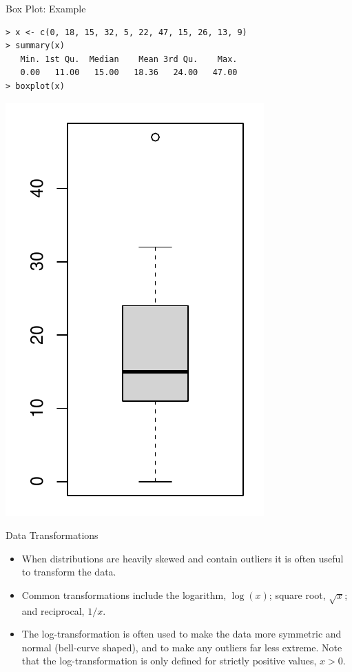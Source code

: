 \documentclass{beamer}
\begin{document}
\begin{frame}[fragile]{Box Plot: Example}
\small
\begin{verbatim}
> x <- c(0, 18, 15, 32, 5, 22, 47, 15, 26, 13, 9)
> summary(x)
   Min. 1st Qu.  Median    Mean 3rd Qu.    Max. 
   0.00   11.00   15.00   18.36   24.00   47.00 
> boxplot(x)
\end{verbatim}
\normalsize
\includegraphics[scale=0.4]{boxplot1.pdf}
\end{frame}

\begin{frame}{Data Transformations}
\begin{itemize}
\item When distributions are heavily skewed and contain outliers it is often useful to transform the data.
\vspace{10pt}
\item Common transformations include the logarithm, $\log(x)$; square root, $\sqrt{x}$; and reciprocal, $1/x$.
\vspace{10pt}
\item  The log-transformation is often used to make the data more symmetric and normal (bell-curve shaped), and to make any outliers far less extreme.  Note that the log-transformation is only defined for strictly positive values, $x>0$.\\ 
\end{itemize}
\end{frame}
\end{document}
